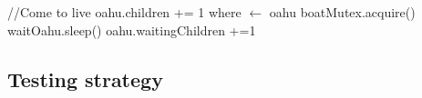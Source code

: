 \documentclass{article}
\begin{document}
	\begin{algorithm}[H]
		\begin{algorithmic}
			\State //Come to live
			\State oahu.children += 1
			\State where $\leftarrow$ oahu
			\While{}
				\State boatMutex.acquire()
						\State waitOahu.sleep()
					\EndWhile
					\State oahu.waitingChildren +=1
					\EndIf
				\EndIf
			\EndWhile
			\EndProcedure
		\end{algorithmic}
	\end{algorithm}
	
	\subsection{Testing strategy}
\end{document}
